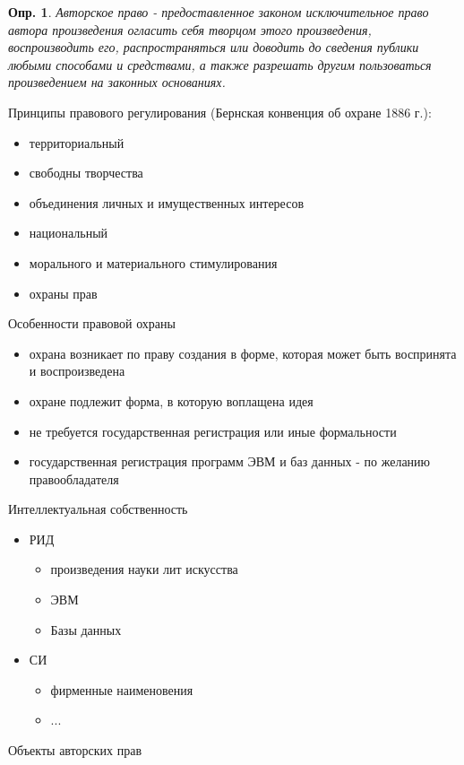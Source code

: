 \documentclass[12pt]{article}
\newtheorem{definition}{Опр.}
\begin{document}
\begin{definition}
Авторское право - предоставленное законом исключительное 
право автора произведения огласить себя творцом этого 
произведения, воспроизводить его, распространяться или 
доводить до сведения публики любыми способами и средствами, 
а также разрешать другим пользоваться произведением на 
законных основаниях.
\end{definition}

Принципы правового регулирования 
(Бернская конвенция об охране 1886 г.):
\begin{itemize}
\item территориальный
\item свободны творчества
\item объединения личных и имущественных интересов
\item национальный
\item морального и материального стимулирования
\item охраны прав
\end{itemize}

Особенности правовой охраны
\begin{itemize}
\item охрана возникает по праву создания в форме, которая может быть воспринята и воспроизведена
\item охране подлежит форма, в которую воплащена идея
\item не требуется государственная регистрация или иные формальности
\item государственная регистрация программ ЭВМ и баз данных - по желанию правообладателя
\end{itemize}

Интеллектуальная собственность
\begin{itemize}
\item  РИД
\begin{itemize}
    \item  произведения науки лит искусства
    \item  ЭВМ
    \item  Базы данных
\end{itemize}
\item СИ
\begin{itemize}
\item  фирменные наименовения 
\item ...
\end{itemize}
\end{itemize}

Объекты авторских прав
\end{document}
